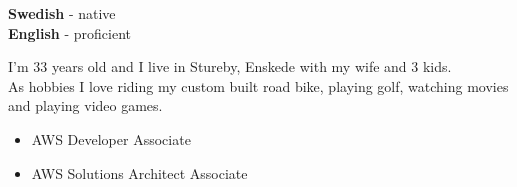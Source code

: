 \documentclass[9pt]{template} %
\begin{document}
\begin{minipage}[t]{0.2\textwidth}
  \vspace{-\baselineskip} %


  \textbf{Swedish} - native\\
  \textbf{English} - proficient
\end{minipage}
\hfill
\begin{minipage}[t]{0.39\textwidth}
  \vspace{-\baselineskip} %


  I’m 33 years old and I live in Stureby, Enskede with my wife and 3 kids.\\
  As hobbies I love riding my custom built road bike, playing golf, watching movies and playing video games.
\end{minipage}
\hfill
\begin{minipage}[t]{0.4\textwidth}
  \vspace{-\baselineskip} %


  \begin{itemize}
    \item AWS Developer {\footnotesize{Associate}}
    \item AWS Solutions Architect {\footnotesize{Associate}}
  \end{itemize}
\end{minipage}


\end{document}
